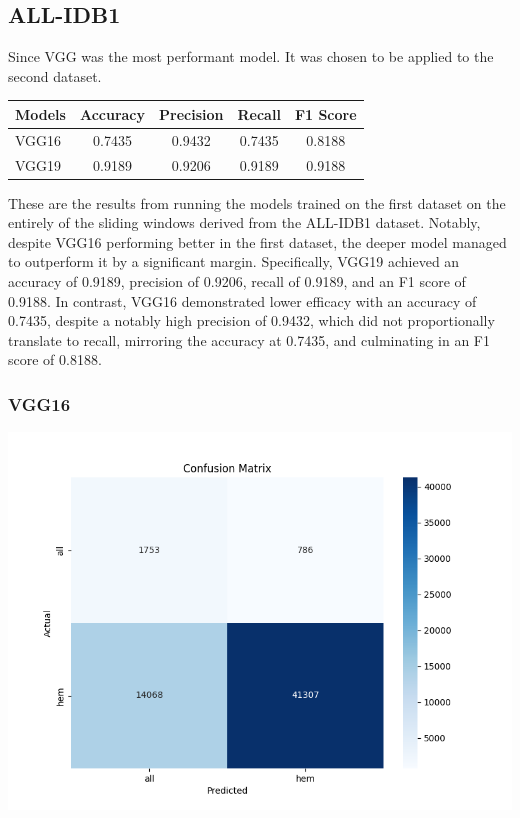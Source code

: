 \documentclass[
	a4paper,
	10pt,
	unnumberedsections,
	twoside,
]{research_article}
\begin{document}
\newpage
\subsection{ALL-IDB1}

Since VGG was the most performant model. It was chosen to be applied to the second dataset.

\begin{table}[ht]
	\centering
	\begin{tabular}{lcccc}
		\hline
		\textbf{Models} & \textbf{Accuracy} & \textbf{Precision} & \textbf{Recall} & \textbf{F1 Score} \\
		\hline
		VGG16 & 0.7435 & 0.9432 & 0.7435 & 0.8188 \\
		VGG19 & 0.9189 & 0.9206 & 0.9189 & 0.9188 \\
		\hline
	\end{tabular}
\end{table}

These are the results from running the models trained on the first dataset on the entirely of the sliding windows derived from the ALL-IDB1 dataset. Notably, despite VGG16 performing better in the first dataset, the deeper model managed to outperform it by a significant margin. Specifically, VGG19 achieved an accuracy of 0.9189, precision of 0.9206, recall of 0.9189, and an F1 score of 0.9188. In contrast, VGG16 demonstrated lower efficacy with an accuracy of 0.7435, despite a notably high precision of 0.9432, which did not proportionally translate to recall, mirroring the accuracy at 0.7435, and culminating in an F1 score of 0.8188. 

\newpage
\subsubsection{VGG16}
\begin{center}
	\includegraphics[width=0.8\linewidth]{images/vgg16_confusion_matrix.png}
\end{center}
\end{document}
